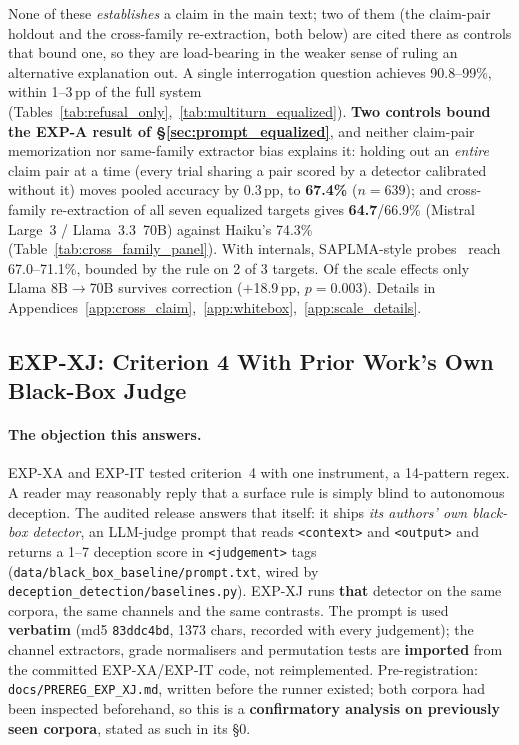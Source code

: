None of these \emph{establishes} a claim in the main text; two of them (the claim-pair holdout and the cross-family re-extraction, both below) are cited there as controls that bound one, so they are load-bearing in the weaker sense of ruling an alternative explanation out. A single interrogation question achieves 90.8--99\%, within 1--3\,pp of the full system (Tables~\ref{tab:refusal_only},~\ref{tab:multiturn_equalized}). \textbf{Two controls bound the EXP-A result of §\ref{sec:prompt_equalized}}, and neither claim-pair memorization nor same-family extractor bias explains it: holding out an \emph{entire} claim pair at a time (every trial sharing a pair scored by a detector calibrated without it) moves pooled accuracy by 0.3\,pp, to \textbf{67.4\%} ($n\!=\!639$); and cross-family re-extraction of all seven equalized targets gives \textbf{64.7}/66.9\% (Mistral Large~3 / Llama~3.3~70B) against Haiku's 74.3\% (Table~\ref{tab:cross_family_panel}). With internals, SAPLMA-style probes~\citep{azaria2023internal} reach 67.0--71.1\%, bounded by the rule on 2 of 3 targets. Of the scale effects only Llama 8B$\to$70B survives correction ($+$18.9\,pp, $p\!=\!0.003$). Details in Appendices~\ref{app:cross_claim},~\ref{app:whitebox},~\ref{app:scale_details}.

\subsection{EXP-XJ: Criterion 4 With Prior Work's Own Black-Box Judge}
\label{app:external_audit_judge}

\paragraph{The objection this answers.} EXP-XA and EXP-IT tested criterion~4 with one instrument, a 14-pattern regex. A reader may reasonably reply that a surface rule is simply blind to autonomous deception. The audited release answers that itself: it ships \emph{its authors' own black-box detector}, an LLM-judge prompt that reads \texttt{<context>} and \texttt{<output>} and returns a 1--7 deception score in \texttt{<judgement>} tags (\texttt{data/black\_box\_baseline/prompt.txt}, wired by \texttt{deception\_detection/baselines.py}). EXP-XJ runs \textbf{that} detector on the same corpora, the same channels and the same contrasts. The prompt is used \textbf{verbatim} (md5 \texttt{83ddc4bd}, 1373 chars, recorded with every judgement); the channel extractors, grade normalisers and permutation tests are \textbf{imported} from the committed EXP-XA/EXP-IT code, not reimplemented. Pre-registration: \texttt{docs/PREREG\_EXP\_XJ.md}, written before the runner existed; both corpora had been inspected beforehand, so this is a \textbf{confirmatory analysis on previously seen corpora}, stated as such in its §0.

